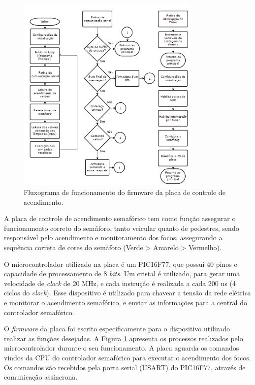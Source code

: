 \begin{figure}[ht]
    \begin{center}
    \includegraphics[width=0.8\textwidth]{figuras/fluxo_fase.PNG}
    \end{center}
    \caption[Placa de fase]{Fluxograma de funcionamento do firmware da placa de controle de acendimento.}
    \label{placa_fase}
\end{figure}

A placa de controle de acendimento semafórico tem como função assegurar o funcionamento correto do semáforo, tanto veicular quanto de pedestres, sendo responsável pelo acendimento e monitoramento dos focos, assegurando a sequência correta de cores do semáforo (Verde > Amarelo > Vermelho).

O microcontrolador utilizado na placa é um PIC16F77, que possui 40 pinos e capacidade de processamento de 8 \textit{bits}. Um cristal é utilizado, para gerar uma velocidade de \textit{clock} de 20 MHz, e cada instrução é realizada a cada 200 ns (4 ciclos do \textit{clock}). Esse dispositivo é utilizado para chavear a tensão da rede elétrica e monitorar o acendimento semafórico, e enviar as informações para a central do controlador semafórico.

O \textit{firmware} da placa foi escrito especificamente para o dispositivo utilizado realizar as funções desejadas. A Figura \ref{placa_fase} apresenta os processos realizados pelo microcontrolador durante o seu funcionamento. A placa aguarda os comandos vindos da \ac{CPU} do controlador semafórico para executar o acendimento dos focos. Os comandos são recebidos pela porta serial (\ac{USART}) do PIC16F77, através de comunicação assíncrona.

